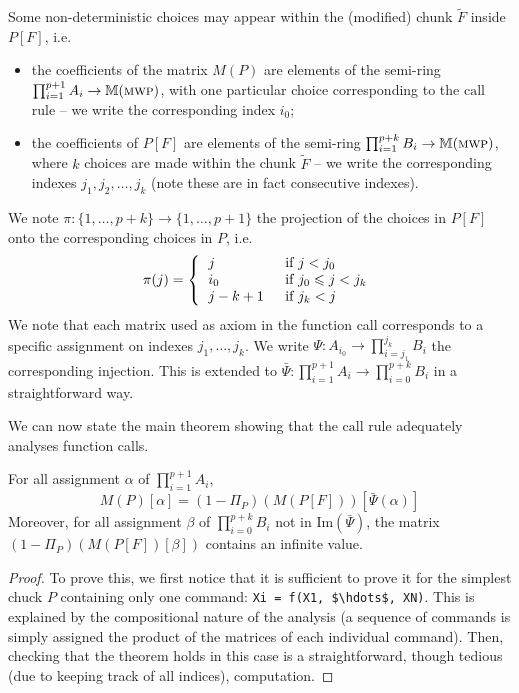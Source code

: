 \documentclass[runningheads]{llncs}
\makeatletter
\newcommand{\pr}{\lstinline[mathescape]}
\newcommand*{\ie}{i.e.\@\xspace}
\makeatother
\begin{document}
Some non-deterministic choices may appear within the (modified) chunk \(\tilde{F}\) inside \(P[F]\), \ie
\begin{itemize}[nolistsep,noitemsep]
	\item the coefficients of the matrix \(M(P)\) are elements of the semi-ring \(\prod_{i=1}^{p+1} A_i \rightarrow \mathbb{M}(\textsc{mwp})\), with one particular choice corresponding to the \(\mathrm{call}\) rule -- we write the corresponding index \(i_0\);
	\item the coefficients of \(P[F]\) are elements of the semi-ring \(\prod_{i=1}^{p+k} B_i\rightarrow \mathbb{M}(\textsc{mwp})\), where \(k\) choices are made within the chunk \(\tilde{F}\) -- we write the corresponding indexes \(j_1,j_2,\dots,j_k\) (note these are in fact consecutive indexes).
\end{itemize}
We note \(\pi: \{1,\dots,p+k\} \rightarrow \{1,\dots,p+1\}\) the projection of the choices in \(P[F]\) onto the corresponding choices in \(P\), \ie
\[
	\pi(j)=\left\{
	\begin{tabular}{ll}
		\(j\)     & \text{ if \(j<j_0\)}               \\
		\(i_0\)   & \text{ if \(j_0 \leqslant j<j_k\)} \\
		\(j-k+1\) & \text{ if \(j_k< j\)}
	\end{tabular}
	\right.
\]
We note that each matrix used as axiom in the function call corresponds to a specific assignment on indexes \(j_1,\dots,j_k\). We write \(\Psi: A_{i_0}\rightarrow \prod_{i=j_1}^{j_k} B_i\) the corresponding injection. This is extended to \(\bar{\Psi}: \prod_{i=1}^{p+1} A_{i}\rightarrow \prod_{i=0}^{p+k} B_i\) in a straightforward way.

We can now state the main theorem showing that the \(\mathrm{call}\) rule adequately analyses function calls.
\begin{theorem}
	For all assignment \(\alpha\) of \(\prod_{i=1}^{p+1} A_i\),
	\[ M(P)[\alpha]=(1-\Pi_P)(M(P[F]))[\bar{\Psi}(\alpha)] \]
	Moreover, for all assignment \(\beta\) of \(\prod_{i=0}^{p+k} B_i\) not in \(\mathrm{Im}(\bar{\Psi})\), the matrix \((1-\Pi_P)(M(P[F])[\beta])\) contains an infinite value.
\end{theorem}

\begin{proof}
	To prove this, we first notice that it is sufficient to prove it for the simplest chuck \(P\) containing only one command: \pr|Xi = f(X1, $\hdots$, XN)|. This is explained by the compositional nature of the analysis (a sequence of commands is simply assigned the product of the matrices of each individual command). Then, checking that the theorem holds in this case is a straightforward, though tedious (due to keeping track of all indices), computation.
\end{proof}
\end{document}
